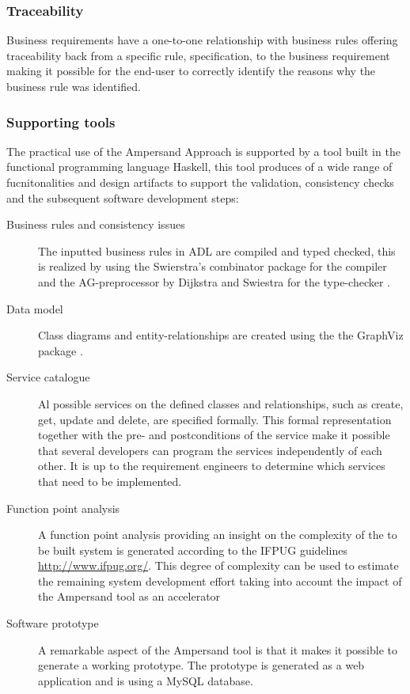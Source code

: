 \subsubsection{Traceability}
Business requirements have a one-to-one relationship with business rules offering traceability back from a specific rule, specification, to the business requirement making it possible for the end-user to correctly identify the reasons why the business rule was identified.

\subsubsection{Supporting tools}
The practical use of the Ampersand Approach is supported by a tool built in the functional programming language Haskell, this tool produces of a wide range of fucnitonalities and design artifacts to support the validation, consistency checks and the subsequent software development steps:
\begin{description}
	\item[Business rules and consistency issues] The inputted business rules in ADL are compiled and typed checked, this is realized by using the Swierstra's combinator package for the compiler   and the AG-preprocessor by Dijkstra and Swiestra for the type-checker .
	\item[Data model]  Class diagrams and entity-relationships are created using the the GraphViz package . 
	\item[Service catalogue] Al possible services on the defined classes and relationships, such as create, get, update and delete,  are specified formally. This formal representation together with the pre- and postconditions of the service make it possible that several developers can program the services independently of each other. It is up to the requirement engineers to determine which services that need to be implemented.
	\item[Function point analysis] A function point analysis providing an insight on the complexity of the to be built system is generated according to the IFPUG guidelines \url{http://www.ifpug.org/}. This degree of complexity can be used to estimate the remaining system development effort taking into account the impact of the Ampersand tool as an accelerator
	\item[Software prototype] A remarkable aspect of the Ampersand tool is that it makes it possible to generate a working prototype. The prototype is generated as a web application and is using a MySQL database.
\end{description}
 
